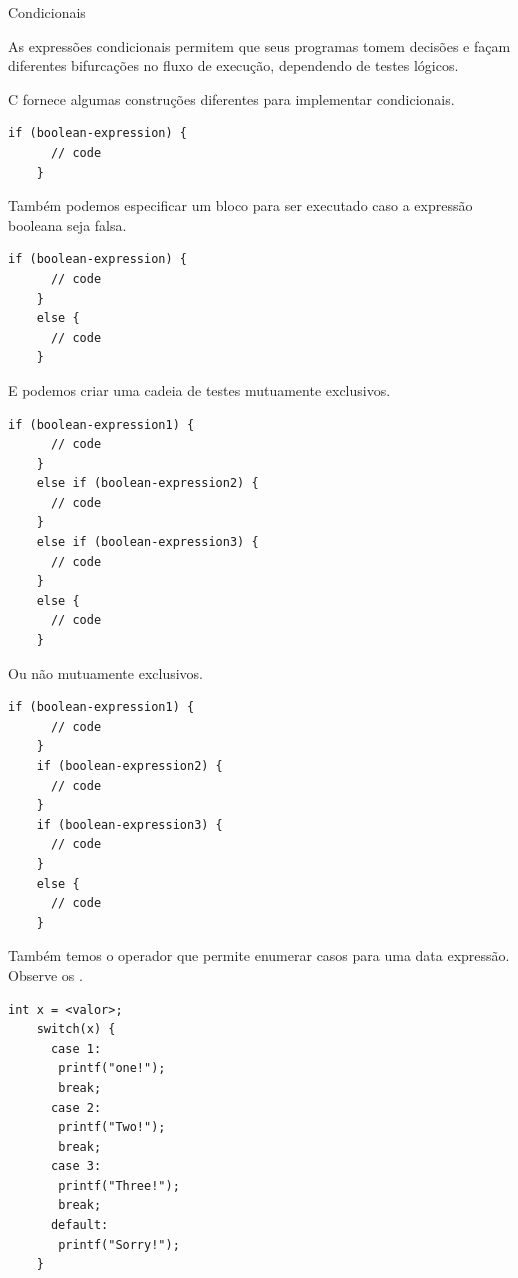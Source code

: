 \documentclass{beamer}
\begin{document}
\begin{frame}{Condicionais}

  As expressões condicionais permitem que seus programas tomem
  decisões e façam diferentes bifurcações no fluxo de execução,
  dependendo de testes lógicos.
  
  C fornece algumas construções diferentes para implementar
  condicionais.

  \begin{lstlisting}[style=normalc]
    if (boolean-expression) {
      // code
    }
  \end{lstlisting}

  \framebreak

  Também podemos especificar um bloco para ser executado caso a
  expressão booleana seja falsa.

  \begin{lstlisting}[style=normalc]
    if (boolean-expression) {
      // code
    }
    else {
      // code
    }
  \end{lstlisting}

  \framebreak

  E podemos criar uma cadeia de testes mutuamente exclusivos.

  \begin{lstlisting}[style=normalc]
    if (boolean-expression1) {
      // code
    }
    else if (boolean-expression2) {
      // code
    }
    else if (boolean-expression3) {
      // code
    }
    else {
      // code
    }
  \end{lstlisting}

  \framebreak

  Ou não mutuamente exclusivos.

  \begin{lstlisting}[style=normalc]
    if (boolean-expression1) {
      // code
    }
    if (boolean-expression2) {
      // code
    }
    if (boolean-expression3) {
      // code
    }
    else {
      // code
    }
  \end{lstlisting}

  \framebreak

  Também temos o operador  que permite enumerar casos
  para uma data expressão. Observe os .

  \begin{lstlisting}[style=normalc]
    int x = <valor>;
    switch(x) {
      case 1:
       printf("one!");
       break;
      case 2:
       printf("Two!");
       break;
      case 3:
       printf("Three!");
       break;
      default:
       printf("Sorry!");
    }
  \end{lstlisting}


\end{frame}
\end{document}

